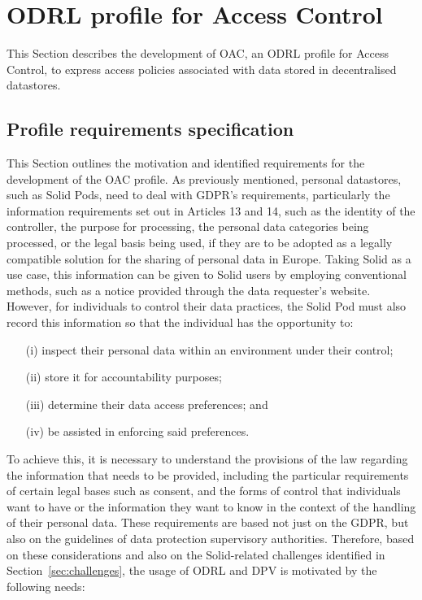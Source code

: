 \section{ODRL profile for Access Control}
\label{sec:oac}

This Section describes the development of OAC, an ODRL profile for Access Control, to express access policies associated with data stored in decentralised datastores.

\subsection{Profile requirements specification}
\label{sec:oac_requirements}

This Section outlines the motivation and identified requirements for the development of the OAC profile.
As previously mentioned, personal datastores, such as Solid Pods, need to deal with GDPR's requirements, particularly the information requirements set out in Articles 13 and 14, such as the identity of the controller, the purpose for processing, the personal data categories being processed, or the legal basis being used, if they are to be adopted as a legally compatible solution for the sharing of personal data in Europe.
Taking Solid as a use case, this information can be given to Solid users by employing conventional methods, such as a notice provided through the data requester's website.
However, for individuals to control their data practices, the Solid Pod must also record this information so that the individual has the opportunity to:

\begin{enumerate}
    \item [(i)] inspect their personal data within an environment under their control;
    \item [(ii)] store it for accountability purposes;
    \item [(iii)] determine their data access preferences; and
    \item [(iv)] be assisted in enforcing said preferences.
\end{enumerate}

To achieve this, it is necessary to understand the provisions of the law regarding the information that needs to be provided, including the particular requirements of certain legal bases such as consent, and the forms of control that individuals want to have or the information they want to know in the context of the handling of their personal data.
These requirements are based not just on the GDPR, but also on the guidelines of data protection supervisory authorities.
Therefore, based on these considerations and also on the Solid-related challenges identified in Section~\ref{sec:challenges}, the usage of ODRL and DPV is motivated by the following needs:


